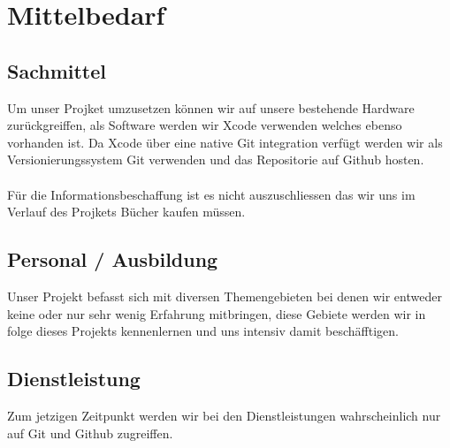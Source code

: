 	\section{Mittelbedarf}
	
	\subsection{Sachmittel}
	
	Um unser Projket umzusetzen können wir auf unsere bestehende Hardware zurückgreiffen, als Software werden wir Xcode verwenden welches ebenso vorhanden ist. 
	Da Xcode über eine native Git integration verfügt werden wir als Versionierungssystem Git verwenden und das Repositorie auf Github hosten. 
	\\ \\
	Für die Informationsbeschaffung ist es nicht auszuschliessen das wir uns im Verlauf des Projkets Bücher kaufen müssen. 
	
	\subsection{Personal / Ausbildung}
	
	Unser Projekt befasst sich mit diversen Themengebieten bei denen wir entweder keine oder nur sehr wenig Erfahrung mitbringen, diese Gebiete werden wir in folge dieses Projekts kennenlernen und uns intensiv damit beschäfftigen. 
	
	\subsection{Dienstleistung}
	Zum jetzigen Zeitpunkt werden wir bei den Dienstleistungen wahrscheinlich nur auf Git und Github zugreiffen.